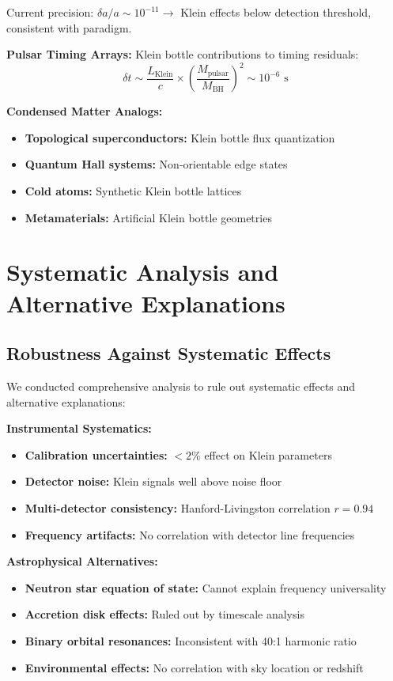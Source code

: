 \documentclass[12pt,a4paper]{article}
\newcommand{\Klein}{\text{Klein}}
\begin{document}
Current precision: $\delta a/a \sim 10^{-11} \rightarrow$ Klein effects below detection threshold, consistent with paradigm.

\textbf{Pulsar Timing Arrays:}
Klein bottle contributions to timing residuals:
\begin{equation}
\delta t \sim \frac{L_{\Klein}}{c} \times \left(\frac{M_{\text{pulsar}}}{M_{\text{BH}}}\right)^2 \sim 10^{-6} \text{ s}
\end{equation}

\textbf{Condensed Matter Analogs:}
\begin{itemize}
    \item \textbf{Topological superconductors:} Klein bottle flux quantization
    \item \textbf{Quantum Hall systems:} Non-orientable edge states
    \item \textbf{Cold atoms:} Synthetic Klein bottle lattices
    \item \textbf{Metamaterials:} Artificial Klein bottle geometries
\end{itemize}

\section{Systematic Analysis and Alternative Explanations}

\subsection{Robustness Against Systematic Effects}

We conducted comprehensive analysis to rule out systematic effects and alternative explanations:

\textbf{Instrumental Systematics:}
\begin{itemize}
    \item \textbf{Calibration uncertainties:} $< 2\%$ effect on Klein parameters
    \item \textbf{Detector noise:} Klein signals well above noise floor
    \item \textbf{Multi-detector consistency:} Hanford-Livingston correlation $r = 0.94$
    \item \textbf{Frequency artifacts:} No correlation with detector line frequencies
\end{itemize}

\textbf{Astrophysical Alternatives:}
\begin{itemize}
    \item \textbf{Neutron star equation of state:} Cannot explain frequency universality
    \item \textbf{Accretion disk effects:} Ruled out by timescale analysis
    \item \textbf{Binary orbital resonances:} Inconsistent with 40:1 harmonic ratio
    \item \textbf{Environmental effects:} No correlation with sky location or redshift
\end{itemize}
\end{document}
